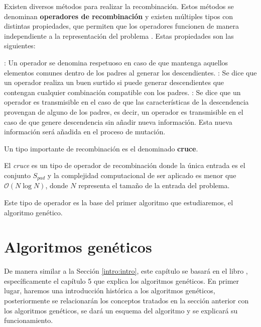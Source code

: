 Existen diversos métodos para realizar la recombinación. Estos métodos se denominan \textbf{operadores de recombinación} y existen múltiples tipos con distintas propiedades, que permiten que los operadores funcionen de manera independiente a la representación del problema \cite{memetic}. Estas propiedades son las siguientes:
\begin{itemize}
    : Un operador se denomina respetuoso en caso de que mantenga aquellos elementos comunes dentro de los padres al generar los descendientes.
    : Se dice que un operador realiza un buen surtido si puede generar descendientes que contengan cualquier combinación compatible con los padres.
    : Se dice que un operador es transmisible en el caso de que las características de la descendencia provengan de alguno de los padres, es decir, un operador es transmisible en el caso de que genere descendencia sin añadir nueva información. Esta nueva información será añadida en el proceso de mutación.
\end{itemize}

Un tipo importante de recombinación es el denominado \textbf{cruce}.

\begin{definition}\label{def:cruce}
    El \textit{cruce} es un tipo de operador de recombinación donde la única entrada es el conjunto $S_{pad}$ y la complejidad computacional de ser aplicado es menor que $\mathcal{O}(N\log N)$, donde $N$ representa el tamaño de la entrada del problema.
\end{definition}

Este tipo de operador es la base del primer algoritmo que estudiaremos, el algoritmo genético.

\section{Algoritmos genéticos}\label{intro:geneticos}
De manera similar a la Sección \ref{intro:intro}, este capítulo se basará en el libro \cite{metah-hb}, específicamente el capítulo 5 que explica los algoritmos genéticos. En primer lugar, haremos una introducción histórica a los algoritmos genéticos, posteriormente se relacionarán los conceptos tratados en la sección anterior con los algoritmos genéticos, se dará un esquema del algoritmo y se explicará su funcionamiento.
